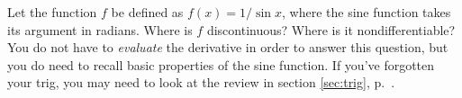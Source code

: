 Let the function $f$ be defined as $f(x)=1/\sin x$, where the sine function takes
its argument in radians.
Where is $f$ discontinuous? Where is it nondifferentiable?
You do not have to \emph{evaluate} the derivative
in order to answer this question, but you do need to recall basic properties of
the sine function. If you've forgotten your trig, you may need
to look at the review in section \ref{sec:trig}, p.~\pageref{sec:trig}.
